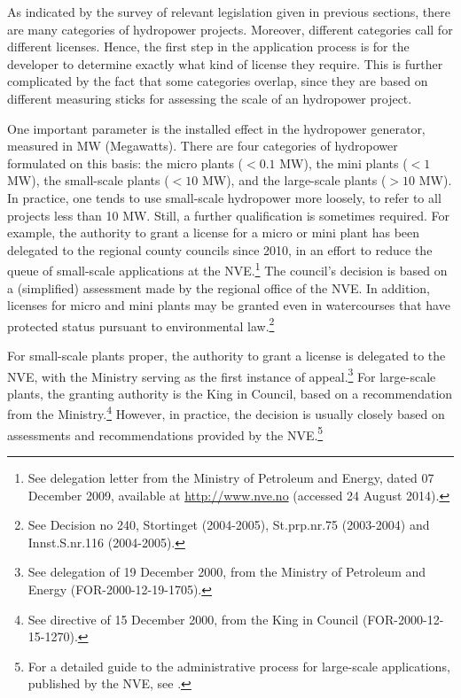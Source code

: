 
As indicated by the survey of relevant legislation given in previous sections, there are many categories of hydropower projects. Moreover, different categories call for different licenses. Hence, the first step in the application process is for the developer to determine exactly what kind of license they require. This is further complicated by the fact that some categories overlap, since they are based on different measuring sticks for assessing the scale of an hydropower project. 

One important parameter is the installed effect in the hydropower generator, measured in MW (Megawatts). There are four categories of hydropower formulated on this basis: the micro plants ($< 0.1$ MW), the mini plants ($< 1$ MW), the small-scale plants ($< 10$ MW), and the large-scale plants ($> 10$ MW). In practice, one tends to use small-scale hydropower more loosely, to refer to all projects less than 10 MW. Still, a further qualification is sometimes required. For example, the authority to grant a license for a micro or mini plant has been delegated to the regional county councils since 2010, in an effort to reduce the queue of small-scale applications at the NVE.\footnote{See delegation letter from the Ministry of Petroleum and Energy, dated 07 December 2009, available at \url{http://www.nve.no} (accessed 24 August 2014).} The council's decision is based on a (simplified) assessment made by the regional office of the NVE. In addition, licenses for micro and mini plants may be granted even in watercourses that have protected status pursuant to environmental law.\footnote{See Decision no 240, Stortinget (2004-2005), St.prp.nr.75 (2003-2004) and Innst.S.nr.116 (2004-2005).}

For small-scale plants proper, the authority to grant a license is delegated to the NVE, with the Ministry serving as the first instance of appeal.\footnote{See delegation of 19 December 2000, from the Ministry of Petroleum and Energy (FOR-2000-12-19-1705).} For large-scale plants, the granting authority is the King in Council, based on a recommendation from the Ministry.\footnote{See directive of 15 December 2000, from the King in Council (FOR-2000-12-15-1270).} However, in practice, the decision is usually closely based on assessments and recommendations provided by the NVE.\footnote{For a detailed guide to the administrative process for large-scale applications, published by the NVE, see \cite{stokker10}.}

